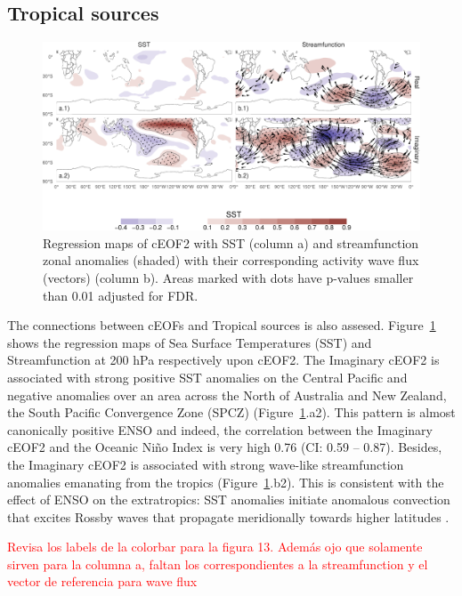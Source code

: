 \documentclass[smallextended]{svjour3}       %
\begin{document}
\hypertarget{tropical-sources}{%
\subsection{Tropical sources}\label{tropical-sources}}



\begin{figure}
\includegraphics{../figures/sst-psi-2-1} \caption{Regression maps of cEOF2 with SST (column a) and streamfunction zonal anomalies (shaded) with their corresponding activity wave flux (vectors) (column b). Areas marked with dots have p-values smaller than 0.01 adjusted for FDR.}\label{fig:sst-psi-2}
\end{figure}

The connections between cEOFs and Tropical sources is also assesed.
Figure~\ref{fig:sst-psi-2} shows the regression maps of Sea Surface Temperatures (SST) and Streamfunction at 200 hPa respectively upon cEOF2. The Imaginary cEOF2 is associated with strong positive SST anomalies on the Central Pacific and negative anomalies over an area across the North of Australia and New Zealand, the South Pacific Convergence Zone (SPCZ) (Figure~\ref{fig:sst-psi-2}.a2). This pattern is almost canonically positive ENSO \citep{bamston1997} and indeed, the correlation between the Imaginary cEOF2 and the Oceanic Niño Index \citep{bamston1997} is very high 0.76 (CI: 0.59 -- 0.87).
Besides, the Imaginary cEOF2 is associated with strong wave-like streamfunction anomalies emanating from the tropics (Figure~\ref{fig:sst-psi-2}.b2). This is consistent with the effect of ENSO on the extratropics: SST anomalies initiate anomalous convection that excites Rossby waves that propagate meridionally towards higher latitudes \citep{mo2000}.

\textcolor{red}{Revisa los labels de la colorbar para la figura 13. Además ojo que solamente sirven para la columna a, faltan los correspondientes a la streamfunction y el vector de referencia para wave flux}
\end{document}

